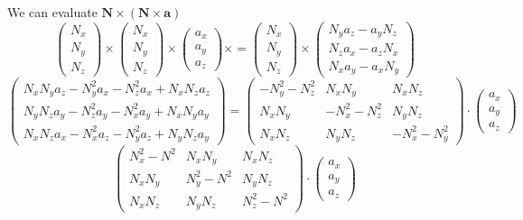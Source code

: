 We can evaluate $\bm{N} \times \left( \bm{N} \times \bm{a} \right)$
\begin{equation*}
	\begin{pmatrix}
		N_x \\ N_y \\ N_z
	\end{pmatrix} \times
	\begin{pmatrix}
		N_x \\ N_y \\ N_z
	\end{pmatrix} \times
	\begin{pmatrix}
		a_x \\ a_y \\ a_z
	\end{pmatrix} \times = 
	\begin{pmatrix}
		N_x \\ N_y \\ N_z
	\end{pmatrix} \times
	\begin{pmatrix}
		N_y a_z - a_y N_z \\ N_z a_x - a_z N_x \\ N_x a_y - a_x N_y
	\end{pmatrix}
\end{equation*}
\begin{equation*}
	\begin{pmatrix}
		N_x N_y a_z - N_y^2 a_x - N_z^2 a_x + N_x N_z a_z \\
		N_y N_z a_y - N_z^2 a_y - N_x^2 a_y + N_x N_y a_y \\
		N_x N_z a_x - N_x^2 a_z - N_y^2 a_z + N_y N_z a_y
	\end{pmatrix} = 
	\begin{pmatrix}
		-N_y^2 - N_z^2 & N_x N_y & N_x N_z \\
		N_x N_y & -N_x^2 - N_z^2 & N_y N_z \\
		N_x N_z & N_y N_z & -N_x^2 -N_y^2
	\end{pmatrix} \cdot
	\begin{pmatrix}
		a_x \\ a_y \\ a_z
	\end{pmatrix}
\end{equation*}
\begin{equation*}
	\begin{pmatrix}
		N_x^2 - N^2 & N_x N_y & N_x N_z \\
		N_x N_y & N_y^2 - N^2 & N_y N_z \\
		N_x N_z & N_y N_z & N_z^2 -N^2
	\end{pmatrix} \cdot
	\begin{pmatrix}
		a_x \\ a_y \\ a_z
	\end{pmatrix}
\end{equation*}
